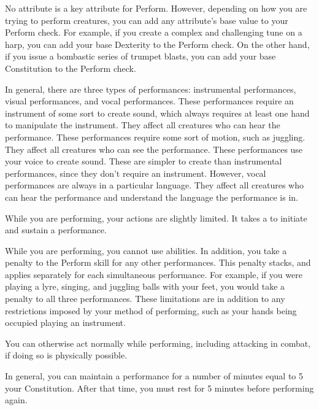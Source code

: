        No attribute is a key attribute for Perform.
        However, depending on how you are trying to perform creatures, you can add any attribute's base value to your Perform check.
        For example, if you create a complex and challenging tune on a harp, you can add your base Dexterity to the Perform check.
        On the other hand, if you issue a bombastic series of trumpet blasts, you can add your base Constitution to the Perform check.

        In general, there are three types of performances: instrumental performances, visual performances, and vocal performances.
         These performances require an instrument of some sort to create sound, which always requires at least one hand to manipulate the instrument.
        They affect all creatures who can hear the performance.
         These performances require some sort of motion, such as juggling.
        They affect all creatures who can see the performance.
         These performances use your voice to create sound.
        These are simpler to create than instrumental performances, since they don't require an instrument.
        However, vocal performances are always in a particular language.
        They affect all creatures who can hear the performance and understand the language the performance is in.

        While you are performing, your actions are slightly limited.
        It takes a  to initiate and sustain a performance.

        While you are performing, you cannot use  abilities.
        In addition, you take a  penalty to the Perform skill for any other performances.
        This penalty stacks, and applies separately for each simultaneous performance.
        For example, if you were playing a lyre, singing, and juggling balls with your feet, you would take a  penalty to all three performances.
        These limitations are in addition to any restrictions imposed by your method of performing, such as your hands being occupied playing an instrument.

        You can otherwise act normally while performing, including attacking in combat, if doing so is physically possible.

        In general, you can maintain a performance for a number of minutes equal to 5 \add your Constitution.
        After that time, you must rest for 5 minutes before performing again.

